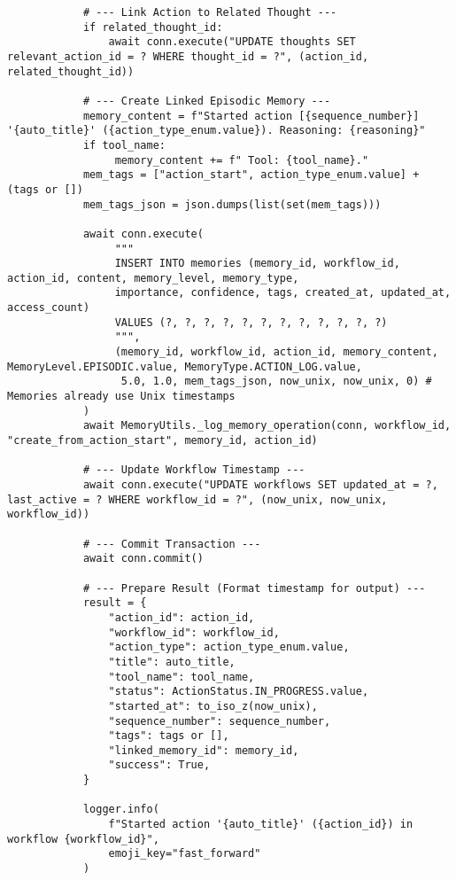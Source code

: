 \documentclass[12pt,a4paper]{article}
\begin{document}
\begin{pageablecode}
\begin{verbatim}
            # --- Link Action to Related Thought ---
            if related_thought_id:
                await conn.execute("UPDATE thoughts SET relevant_action_id = ? WHERE thought_id = ?", (action_id, related_thought_id))

            # --- Create Linked Episodic Memory ---
            memory_content = f"Started action [{sequence_number}] '{auto_title}' ({action_type_enum.value}). Reasoning: {reasoning}"
            if tool_name:
                 memory_content += f" Tool: {tool_name}."
            mem_tags = ["action_start", action_type_enum.value] + (tags or [])
            mem_tags_json = json.dumps(list(set(mem_tags)))

            await conn.execute(
                 """
                 INSERT INTO memories (memory_id, workflow_id, action_id, content, memory_level, memory_type,
                 importance, confidence, tags, created_at, updated_at, access_count)
                 VALUES (?, ?, ?, ?, ?, ?, ?, ?, ?, ?, ?, ?)
                 """,
                 (memory_id, workflow_id, action_id, memory_content, MemoryLevel.EPISODIC.value, MemoryType.ACTION_LOG.value,
                  5.0, 1.0, mem_tags_json, now_unix, now_unix, 0) # Memories already use Unix timestamps
            )
            await MemoryUtils._log_memory_operation(conn, workflow_id, "create_from_action_start", memory_id, action_id)

            # --- Update Workflow Timestamp ---
            await conn.execute("UPDATE workflows SET updated_at = ?, last_active = ? WHERE workflow_id = ?", (now_unix, now_unix, workflow_id))

            # --- Commit Transaction ---
            await conn.commit()

            # --- Prepare Result (Format timestamp for output) ---
            result = {
                "action_id": action_id,
                "workflow_id": workflow_id,
                "action_type": action_type_enum.value,
                "title": auto_title,
                "tool_name": tool_name,
                "status": ActionStatus.IN_PROGRESS.value,
                "started_at": to_iso_z(now_unix),     
                "sequence_number": sequence_number,
                "tags": tags or [],
                "linked_memory_id": memory_id,
                "success": True,
            }

            logger.info(
                f"Started action '{auto_title}' ({action_id}) in workflow {workflow_id}",
                emoji_key="fast_forward"
            )


\end{verbatim}
\end{pageablecode}
\end{document}
